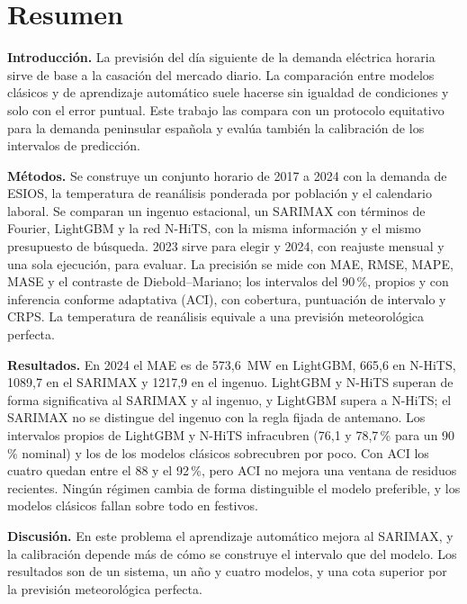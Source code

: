 \chapter*{Resumen}

\textbf{Introducción.} La previsión del día siguiente de la demanda eléctrica
horaria sirve de base a la casación del mercado diario. La comparación entre
modelos clásicos y de aprendizaje automático suele hacerse sin igualdad de
condiciones y solo con el error puntual. Este trabajo las compara con un
protocolo equitativo para la demanda peninsular española y evalúa también la
calibración de los intervalos de predicción.

\textbf{Métodos.} Se construye un conjunto horario de 2017 a 2024 con la demanda
de ESIOS, la temperatura de reanálisis ponderada por población y el calendario
laboral. Se comparan un ingenuo estacional, un SARIMAX con términos de Fourier,
LightGBM y la red N-HiTS, con la misma información y el mismo presupuesto de
búsqueda. 2023 sirve para elegir y 2024, con reajuste mensual y una sola
ejecución, para evaluar. La precisión se mide con MAE, RMSE, MAPE, MASE y el
contraste de Diebold--Mariano; los intervalos del 90\,\%, propios y con
inferencia conforme adaptativa (ACI), con cobertura, puntuación de intervalo y
CRPS. La temperatura de reanálisis equivale a una previsión meteorológica
perfecta.

\textbf{Resultados.} En 2024 el MAE es de 573,6~MW en LightGBM, 665,6 en N-HiTS,
1089,7 en el SARIMAX y 1217,9 en el ingenuo. LightGBM y N-HiTS superan de forma
significativa al SARIMAX y al ingenuo, y LightGBM supera a N-HiTS; el SARIMAX no
se distingue del ingenuo con la regla fijada de antemano. Los intervalos propios
de LightGBM y N-HiTS infracubren (76,1 y 78,7\,\% para un 90\,\% nominal) y los
de los modelos clásicos sobrecubren por poco. Con ACI los cuatro quedan entre el
88 y el 92\,\%, pero ACI no mejora una ventana de residuos recientes. Ningún
régimen cambia de forma distinguible el modelo preferible, y los modelos
clásicos fallan sobre todo en festivos.

\textbf{Discusión.} En este problema el aprendizaje automático mejora al SARIMAX,
y la calibración depende más de cómo se construye el intervalo que del modelo.
Los resultados son de un sistema, un año y cuatro modelos, y una cota superior
por la previsión meteorológica perfecta.

